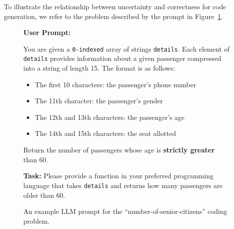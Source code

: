 To illustrate the relationship between uncertainty and correctness for code generation, we refer to the problem described by the prompt in Figure~\ref{fig:sampleproblem}. 

\begin{figure}[htbp]
    \centering
    \begin{tcolorbox}[
        enhanced,
        width=0.85\textwidth,
        colback=white,
        colframe=blue!50!black,
        boxrule=1pt,
        arc=5pt,              
        title=LLM Prompt,
        fonttitle=\bfseries,
        attach boxed title to top center={yshift=-2mm},
        varwidth boxed title=0.7\linewidth
      ]
    \textbf{User Prompt:}

    \vspace{0.5em}
    You are given a \texttt{0-indexed} array of strings \texttt{details}. Each element of \texttt{details} provides information about a given passenger compressed into a string of length 15. The format is as follows:
    \begin{itemize}
        \item The first 10 characters: the passenger's phone number
        \item The 11th character: the passenger's gender
        \item The 12th and 13th characters: the passenger's age
        \item The 14th and 15th characters: the seat allotted
    \end{itemize}
    Return the number of passengers whose age is \textbf{strictly greater} than 60.


    \vspace{0.5em}
    \textbf{Task:} 
    Please provide a function in your preferred programming language that takes \texttt{details} and returns how many passengers are older than 60.
    \end{tcolorbox}
    \caption{An example LLM prompt for the ``number-of-senior-citizens'' coding problem.}
    \label{fig:sampleproblem}
\end{figure}

